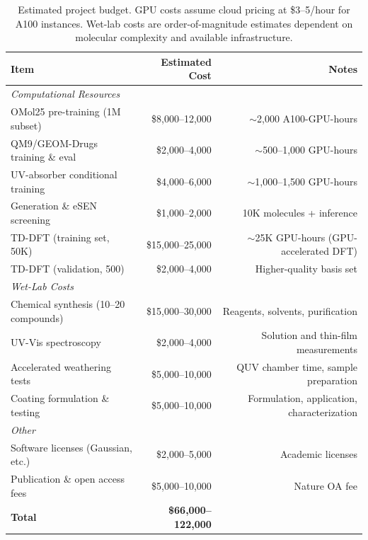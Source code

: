 \documentclass[11pt,a4paper]{article}
\begin{document}
\begin{table}[h!]
\centering
\small
\renewcommand{\arraystretch}{1.2}
\begin{tabular}{lrr}
  \toprule
  \textbf{Item} & \textbf{Estimated Cost} & \textbf{Notes} \\
  \midrule
  \multicolumn{3}{l}{\textit{Computational Resources}} \\
  \quad OMol25 pre-training (1M subset)  & \$8,000--12,000  & $\sim$2,000 A100-GPU-hours \\
  \quad QM9/GEOM-Drugs training \& eval  & \$2,000--4,000   & $\sim$500--1,000 GPU-hours \\
  \quad UV-absorber conditional training  & \$4,000--6,000   & $\sim$1,000--1,500 GPU-hours \\
  \quad Generation \& eSEN screening     & \$1,000--2,000   & 10K molecules + inference \\
  \quad TD-DFT (training set, 50K)       & \$15,000--25,000  & $\sim$25K GPU-hours (GPU-accelerated DFT) \\
  \quad TD-DFT (validation, 500)         & \$2,000--4,000   & Higher-quality basis set \\
  \midrule
  \multicolumn{3}{l}{\textit{Wet-Lab Costs}} \\
  \quad Chemical synthesis (10--20 compounds) & \$15,000--30,000 & Reagents, solvents, purification \\
  \quad UV-Vis spectroscopy              & \$2,000--4,000   & Solution and thin-film measurements \\
  \quad Accelerated weathering tests     & \$5,000--10,000  & QUV chamber time, sample preparation \\
  \quad Coating formulation \& testing   & \$5,000--10,000  & Formulation, application, characterization \\
  \midrule
  \multicolumn{3}{l}{\textit{Other}} \\
  \quad Software licenses (Gaussian, etc.)& \$2,000--5,000  & Academic licenses \\
  \quad Publication \& open access fees  & \$5,000--10,000  & Nature OA fee \\
  \midrule
  \textbf{Total}                         & \textbf{\$66,000--122,000} & \\
  \bottomrule
\end{tabular}
\caption{Estimated project budget. GPU costs assume cloud pricing at \$3--5/hour for
A100 instances. Wet-lab costs are order-of-magnitude estimates dependent on molecular
complexity and available infrastructure.}
\label{tab:budget}
\end{table}
\end{document}
